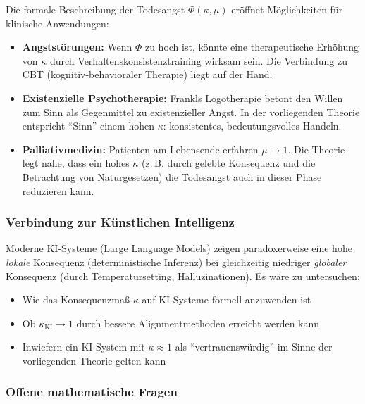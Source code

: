 ﻿\documentclass[a4paper,12pt]{article}
\theoremstyle{definition}
\begin{document}
Die formale Beschreibung der Todesangst $\Phi(\kappa, \mu)$ eröffnet Möglichkeiten für klinische Anwendungen:
\begin{itemize}
\item \textbf{Angststörungen:} Wenn $\Phi$ zu hoch ist, könnte eine therapeutische Erhöhung von $\kappa$ durch Verhaltenskonsistenztraining wirksam sein. Die Verbindung zu CBT (kognitiv-behavioraler Therapie) liegt auf der Hand.
\item \textbf{Existenzielle Psychotherapie:} Frankls Logotherapie \cite{frankl1946} betont den Willen zum Sinn als Gegenmittel zu existenzieller Angst. In der vorliegenden Theorie entspricht ``Sinn'' einem hohen $\kappa$: konsistentes, bedeutungsvolles Handeln.
\item \textbf{Palliativmedizin:} Patienten am Lebensende erfahren $\mu \to 1$. Die Theorie legt nahe, dass ein hohes $\kappa$ (z.\,B. durch gelebte Konsequenz und die Betrachtung von Naturgesetzen) die Todesangst auch in dieser Phase reduzieren kann.
\end{itemize}

\subsubsection{Verbindung zur Künstlichen Intelligenz}

Moderne KI-Systeme (Large Language Models) zeigen paradoxerweise eine hohe \emph{lokale} Konsequenz (deterministische Inferenz) bei gleichzeitig niedriger \emph{globaler} Konsequenz (durch Temperatursetting, Halluzinationen). Es wäre zu untersuchen:
\begin{itemize}
\item Wie das Konsequenzmaß $\kappa$ auf KI-Systeme formell anzuwenden ist
\item Ob $\kappa_{\text{KI}} \to 1$ durch bessere Alignmentmethoden erreicht werden kann
\item Inwiefern ein KI-System mit $\kappa \approx 1$ als ``vertrauenswürdig'' im Sinne der vorliegenden Theorie gelten kann
\end{itemize}

\subsubsection{Offene mathematische Fragen}
\end{document}
